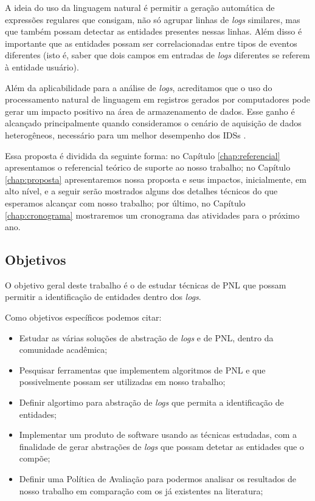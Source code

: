 \documentclass[
	12pt,				%
	openright,			%
	twoside,			%
	a4paper,			%
	english,			%
	spanish,			%
	brazil,				%
	]{abntex2}
\begin{document}

A ideia do uso da linguagem natural é permitir a geração automática de expressões regulares que consigam, não só agrupar linhas de \emph{logs} similares, mas que também possam detectar as entidades presentes nessas linhas. Além disso é importante que as entidades possam ser correlacionadas entre tipos de eventos diferentes (isto é, saber que dois campos em entradas de \emph{logs} diferentes se referem à entidade usuário).

Além da aplicabilidade para a análise de \emph{logs}, acreditamos que o uso do processamento natural de linguagem em registros gerados por computadores pode gerar um impacto positivo na área de armazenamento de dados. Esse ganho é alcançado principalmente quando consideramos o cenário de aquisição de dados heterogêneos, necessário para um melhor desempenho dos IDSs \cite{zuech2015intrusion}.

Essa proposta é dividida da seguinte forma: no Capítulo \ref{chap:referencial} apresentamos o referencial teórico de suporte ao nosso trabalho; no Capítulo \ref{chap:proposta} apresentaremos nossa proposta e seus impactos, inicialmente, em alto nível, e a seguir serão mostrados alguns dos detalhes técnicos do que esperamos alcançar com nosso trabalho; por último, no Capítulo \ref{chap:cronograma} mostraremos um cronograma das atividades para o próximo ano.

\subsection{Objetivos}
O objetivo geral deste trabalho é o de estudar técnicas de PNL que possam permitir a identificação de entidades dentro dos \emph{logs}.

Como objetivos específicos podemos citar:
\begin{itemize}
	\item Estudar as várias soluções de abstração de \emph{logs} e de PNL, dentro da comunidade acadêmica;

	\item Pesquisar ferramentas que implementem algoritmos de PNL e que possivelmente possam ser utilizadas em nosso trabalho;
	
	\item Definir algortimo para abstração de \emph{logs} que permita a identificação de entidades;
		
	\item Implementar um produto de software usando as técnicas estudadas, com a finalidade de gerar abstrações de \emph{logs} que possam detetar as entidades que o compõe;
	
	\item Definir uma Política de Avaliação para podermos analisar os resultados de nosso trabalho em comparação com os já existentes na literatura;

\end{itemize}
\end{document}
